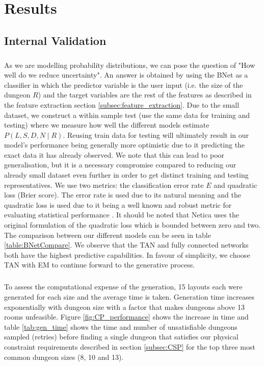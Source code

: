 \documentclass{UoYCSproject}
\begin{document}
\chapter{Results}
\label{cha:results}
\section{Internal Validation}
\paragraph{}
As we are modelling probability distributions, we can pose the question of "How well do we reduce uncertainty". An answer is obtained by using the BNet as a classifier in which the predictor variable is the user input (i.e. the size of the dungeon \(R\)) and the target variables are the rest of the features as described in the feature extraction section \ref{subsec:feature_extraction}.
Due to the small dataset, we construct a within sample test (use the same data for training and testing) where we measure how well the different models estimate \(P(L,S,D,N \mid R)\). Reusing train data for testing will ultimately result in our model's performance being generally more optimistic due to it predicting the exact data it has already observed. We note that this can lead to poor generalisation, but it is a necessary compromise compared to reducing our already small dataset even further in order to get distinct training and testing representatives. We use two metrics: the classification error rate \(E\) and quadratic loss (Brier score). The error rate is used due to its natural meaning and the quadratic loss is used due to it being a well known and robust metric for evaluating statistical performance \parencite{PearlScoringRules}. It should be noted that Netica uses the original formulation of the quadratic loss which is bounded between zero and two. The comparison between our different models can be seen in table \ref{table:BNetCompare}. We observe that the TAN and fully connected networks both have the highest predictive capabilities. In favour of simplicity, we choose TAN with EM to continue forward to the generative process.

\paragraph{}
To assess the computational expense of the generation, 15 layouts each were generated for each size and the average time is taken. Generation time increases exponentially with dungeon size with a factor that makes dungeons above 13 rooms unfeasible. Figure \ref{fig:CP_performance} shows the increase in time and table \ref{tab:gen_time} shows the time and number of unsatisfiable dungeons sampled (retries) before finding a single dungeon that satisfies our physical constraint requirements described in section \ref{subsec:CSP} for the top three most common dungeon sizes (8, 10 and 13).
\end{document}
